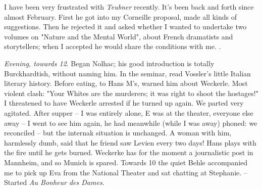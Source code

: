 
\missing

I have been very frustrated with \textit{Teubner} recently. It's been back and forth since almost February. First he got into my Corneille proposal, made all kinds of suggestions. Then he rejected it and asked whether I wanted to undertake two volumes on "Nature and the Mental World", about French dramatists and storytellers; when I accepted he would share the conditions with me. .

\textit{Evening, towards 12}. Began Nolhac; his good introduction is totally Burckhardtish, without naming him. In the seminar, read Vossler's little Italian literary history. Before eating, to Hans M's, warned him about Weckerle. Most violent clash: "Your Whites are the murderers; it was right to shoot the hostages!" I threatened to have Weckerle arrested if he turned up again. We parted very agitated. After supper -- I was entirely alone, E was at the theater, everyone else away -- I went to see him again, he had meanwhile (while I was away) phoned: we reconciled -- but the internak situation is unchanged. A woman with him, harmlessly dumb, said that he friend saw Levien every two days! Hans plays with the fire until he gets burned. Weckerke has for the moment a journalistic post in Mannheim, and so Munich is spared. Towards 10 the quiet Behle accompanied me to pick up Eva from the National Theater and sat chatting at Stephanie. -- Started \textit{Au Bonheur des Dames}.